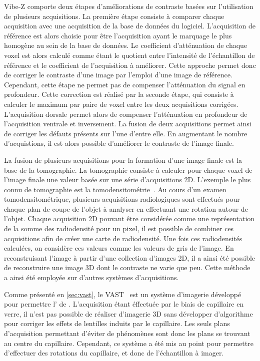 \documentclass[\main/main.tex]{subfiles}
\begin{document}
%
Vibe-Z comporte deux étapes d'améliorations de contraste basées sur l'utilisation de plusieurs acquisitions. La première étape consiste à comparer chaque acquisition avec une acquisition de la base de données du logiciel.
%
L'acquisition de référence est alors choisie pour être l'acquisition ayant le marquage le plus homogène au sein de la base de données.
%
Le coefficient d'atténuation de chaque voxel est alors calculé comme étant le quotient entre l'intensité de l'échantillon de référence et le coefficient de l'acquisition à améliorer.
%
Cette approche permet donc de corriger le contraste d'une image par l'emploi d'une image de référence.
%
Cependant, cette étape ne permet pas de compenser l'atténuation du signal en profondeur.
%
Cette correction est réalisé par la seconde étape, qui consiste à calculer le maximum par paire de voxel entre les deux acquisitions corrigées.
%
L'acquisition dorsale permet alors de compenser l'atténuation en profondeur de l'acquisition ventrale et inversement.
%
La fusion de deux acquisitions permet ainsi de corriger les défauts présents sur l'une d'entre elle.
%
En augmentant le nombre d'acquistions, il est alors possible d'améliorer le contraste de l'image finale.

%
La fusion de plusieurs acquisitions pour la formation d'une image finale est la base de la tomographie.
%
La tomographie consiste à calculer pour chaque voxel de l'image finale une valeur basée sur une série d'acquisitions 2D.
%
L'exemple le plus connu de tomographie est la tomodensitométrie~\cite{hounsfield_1973}.
%
Au cours d'un examen tomodensitométrique, plusieurs acquisitions radiologiques sont effectués pour chaque plan de coupe de l'objet à analyser en effectuant une rotation autour de l'objet.
%
Chaque acquisition 2D pouvant être considérée comme une représentation de la somme des radiodensité pour un pixel,
il est possible de combiner ces acquisitions afin de créer une carte de radiodensité.
%
Une fois ces radiodensités calculées, on considère ces valeurs comme les valeurs de gris de l'image.
%
En reconstruisant l'image à partir d'une collection d'images 2D, il a ainsi été possible de reconstruire une image 3D dont le contraste ne varie que peu.
%
Cette méthode a ainsi été employée sur d'autres systèmes d'acquisitions.

%
Comme présenté en \autoref{sec:vast}, le VAST~\cite{pardomartin_2010} est un système d'imagerie développé pour permettre l'\hti{} de \pz{}.
%
L'acquisition étant éffectuée par le biais de capillaire en verre, il n'est pas possible de réaliser d'imagerie 3D sans développer d'algorithme pour corriger les effets de lentilles induits par le capillaire.
%
Les seuls plans d'acquisition permettant d'éviter de phénomènes sont donc les plans se trouvant au centre du capillaire.
%
Cependant, ce système a été mis au point pour permettre d'effectuer des rotations du capillaire, et donc de l'échantillon à imager.
\end{document}

